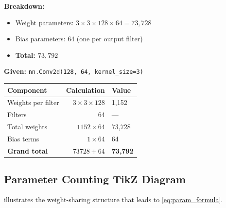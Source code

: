 \documentclass[12pt,a4paper]{article}
\begin{document}
\noindent
\textbf{Breakdown:}
\begin{itemize}[noitemsep]
  \item Weight parameters: $3 \times 3 \times 128 \times 64 = 73{,}728$
  \item Bias parameters: $64$ (one per output filter)
  \item \textbf{Total: $73{,}792$}
\end{itemize}

\begin{example}[title=Step-by-step parameter count]
\textbf{Given:} \texttt{nn.Conv2d(128, 64, kernel\_size=3)}

\medskip
\begin{tabular}{@{}lrl@{}}
  \toprule
  Component & Calculation & Value \\
  \midrule
  Weights per filter & $3 \times 3 \times 128$ & 1,152 \\
  Filters            & 64                      & --- \\
  Total weights      & $1152 \times 64$        & 73,728 \\
  Bias terms         & $1 \times 64$           & 64 \\
  \midrule
  \textbf{Grand total} & $73728 + 64$ & \textbf{73,792} \\
  \bottomrule
\end{tabular}
\end{example}

\subsection{Parameter Counting TikZ Diagram}
\label{subsec:param_diagram}

 illustrates the weight-sharing structure that leads
to \cref{eq:param_formula}.
\end{document}
